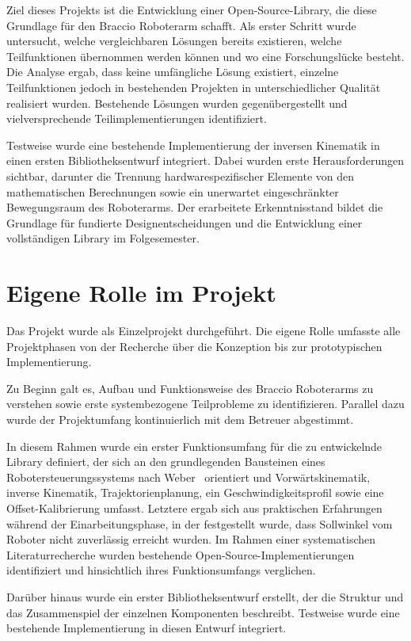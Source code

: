 \documentclass[12pt,a4paper]{article}
\begin{document}
Ziel dieses Projekts ist die Entwicklung einer Open-Source-Library, die diese Grundlage für den Braccio Roboterarm schafft. Als erster Schritt wurde untersucht, welche vergleichbaren Lösungen bereits existieren, welche Teilfunktionen übernommen werden können und wo eine Forschungslücke besteht. Die Analyse ergab, dass keine umfängliche Lösung existiert, einzelne Teilfunktionen jedoch in bestehenden Projekten in unterschiedlicher Qualität realisiert wurden. Bestehende Lösungen wurden gegenübergestellt und vielversprechende Teilimplementierungen identifiziert. 

Testweise wurde eine bestehende Implementierung der inversen Kinematik in einen ersten Bibliotheksentwurf integriert. Dabei wurden erste Herausforderungen sichtbar, darunter die Trennung hardwarespezifischer Elemente von den mathematischen Berechnungen sowie ein unerwartet eingeschränkter Bewegungsraum des Roboterarms. Der erarbeitete Erkenntnisstand bildet die Grundlage für fundierte Designentscheidungen und die Entwicklung einer vollständigen Library im Folgesemester.

\newpage
\section{Eigene Rolle im Projekt}
\label{sec:Rolle}

Das Projekt wurde als Einzelprojekt durchgeführt. Die eigene Rolle umfasste alle Projektphasen von der Recherche über die Konzeption bis zur prototypischen Implementierung. 

Zu Beginn galt es, Aufbau und Funktionsweise des Braccio Roboterarms zu verstehen sowie erste systembezogene Teilprobleme zu identifizieren. Parallel dazu wurde der Projektumfang kontinuierlich mit dem Betreuer abgestimmt. 

In diesem Rahmen wurde ein erster Funktionsumfang für die zu entwickelnde Library definiert, der sich an den grundlegenden Bausteinen eines Robotersteuerungssystems nach Weber~\cite{Weber.2017} orientiert und Vorwärtskinematik, inverse Kinematik, Trajektorienplanung, ein 
Geschwindigkeitsprofil sowie eine Offset-Kalibrierung umfasst. Letztere ergab sich aus praktischen Erfahrungen während der Einarbeitungsphase, in der festgestellt wurde, dass Sollwinkel vom Roboter nicht zuverlässig erreicht wurden. Im Rahmen einer systematischen Literaturrecherche wurden bestehende Open-Source-Implementierungen identifiziert und hinsichtlich ihres Funktionsumfangs verglichen.

Darüber hinaus wurde ein erster Bibliotheksentwurf erstellt, der die Struktur und das Zusammenspiel der einzelnen Komponenten beschreibt. Testweise wurde eine bestehende Implementierung in diesen Entwurf integriert.
\end{document}
